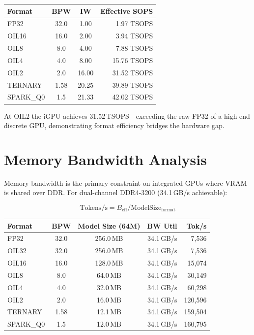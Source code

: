 \begin{longtable}{lccr}
\toprule
\textbf{Format} & \textbf{BPW} & \textbf{IW} & \textbf{Effective SOPS} \\
\midrule
\endhead
FP32      & 32.0 & 1.00   & 1.97  TSOPS \\
OIL16     & 16.0 & 2.00   & 3.94  TSOPS \\
OIL8      & 8.0  & 4.00   & 7.88  TSOPS \\
OIL4      & 4.0  & 8.00   & 15.76 TSOPS \\
OIL2      & 2.0  & 16.00  & 31.52 TSOPS \\
TERNARY   & 1.58 & 20.25  & 39.89 TSOPS \\
SPARK\_Q0 & 1.5  & 21.33  & 42.02 TSOPS \\
\bottomrule
\end{longtable}

At OIL2 the iGPU achieves 31.52\,TSOPS---exceeding the raw FP32 of a high-end
discrete GPU, demonstrating format efficiency bridges the hardware gap.

\section{Memory Bandwidth Analysis}
\label{sec:gpu_bandwidth}

Memory bandwidth is the primary constraint on integrated GPUs where VRAM is
shared over DDR. For dual-channel DDR4-3200 (34.1\,GB/s achievable):

\begin{equation}
\mathrm{Tokens/s} = B_{\mathrm{eff}} / \mathrm{ModelSize}_{\mathrm{format}}
\end{equation}

\begin{longtable}{lccrr}
\toprule
\textbf{Format} & \textbf{BPW} & \textbf{Model Size (64M)} & \textbf{BW Util} & \textbf{Tok/s} \\
\midrule
\endhead
FP32      & 32.0 & 256.0\,MB & 34.1\,GB/s &  7,536 \\
OIL32     & 32.0 & 256.0\,MB & 34.1\,GB/s &  7,536 \\
OIL16     & 16.0 & 128.0\,MB & 34.1\,GB/s & 15,074 \\
OIL8      & 8.0  &  64.0\,MB & 34.1\,GB/s & 30,149 \\
OIL4      & 4.0  &  32.0\,MB & 34.1\,GB/s & 60,298 \\
OIL2      & 2.0  &  16.0\,MB & 34.1\,GB/s & 120,596 \\
TERNARY   & 1.58 &  12.1\,MB & 34.1\,GB/s & 159,504 \\
SPARK\_Q0 & 1.5  &  12.0\,MB & 34.1\,GB/s & 160,795 \\
\bottomrule
\end{longtable}

